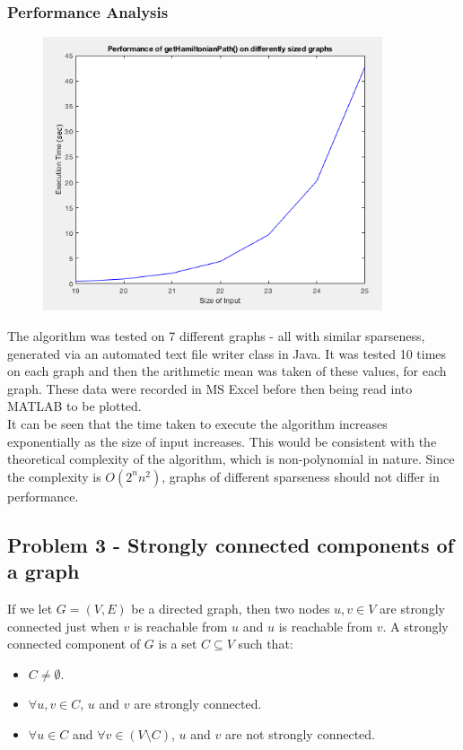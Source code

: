 \documentclass[11pt]{article}
\begin{document}
 	\subsubsection{Performance Analysis}
 	\begin{figure}[h!]
 		\centering
 		\includegraphics[width=100mm,scale=0.5]{images/hamiltonian_performance.png}
 	\end{figure}
 	The algorithm was tested on 7 different graphs - all with similar sparseness, generated via an automated text file writer class in Java. It was tested 10 times on each graph and then the arithmetic mean was taken of these values, for each graph. These data were recorded in MS Excel before then being read into MATLAB to be plotted. \\
 	It can be seen that the time taken to execute the algorithm increases exponentially as the size of input increases. This would be consistent with the theoretical complexity of the algorithm, which is non-polynomial in nature.
	Since the complexity is \(O(2^n n^2)\), graphs of different sparseness should not differ in performance.
	\subsection{Problem 3 - Strongly connected components of a graph}
	If we let \(G = (V,E)\) be a directed graph, then two nodes \(u,v \in V\) are strongly connected just when \(v\) is reachable from \(u\) and \(u\) is reachable from \(v\).
	\newline
	A strongly connected component of \(G\) is a set \(C\subseteq V\) such that:
	\begin{itemize}
		\item \(C \neq \emptyset\).
		\item \(\forall u,v \in C\), \(u\) and \(v\) are strongly connected.
		\item \(\forall u \in C\) and \(\forall v \in (V \setminus C)\), \(u\) and \(v\) are not strongly connected. \cite{stanford}
	\end{itemize}
\end{document}

